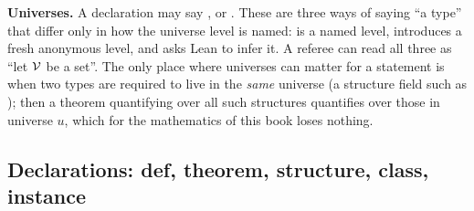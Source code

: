 \textbf{Universes.} A declaration may say ,  or
. These are three ways of saying ``a type'' that differ only in how the universe level
is named:  is a named level,  introduces a fresh anonymous level, and \lean{_}
asks Lean to infer it. A referee can read all three as ``let $\mathcal{V}$ be a set''. The only place
where universes can matter for a statement is when two types are required to live in the
\emph{same} universe (a structure field such as ); then a theorem quantifying
over all such structures quantifies over those in universe $u$, which for the mathematics of this
book loses nothing.

\subsection{Declarations: def, theorem, structure, class, instance}

